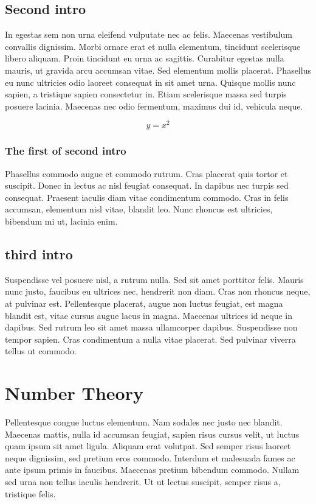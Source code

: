 \documentclass[a4paper, 12pt]{article}
\begin{document}
	
	\subsection{Second intro}
	\begin{center}
		In egestas sem non urna eleifend vulputate nec ac felis. Maecenas vestibulum convallis dignissim. Morbi ornare erat et nulla elementum, tincidunt scelerisque libero aliquam. Proin tincidunt eu urna ac sagittis. Curabitur egestas nulla mauris, ut gravida arcu accumsan vitae. Sed elementum mollis placerat. Phasellus eu nunc ultricies odio laoreet consequat in sit amet urna. Quisque mollis nunc sapien, a tristique sapien consectetur in. Etiam scelerisque massa sed turpis posuere lacinia. Maecenas nec odio fermentum, maximus dui id, vehicula neque.
	\end{center}
	
	\begin{equation}
		y = x^2
	\end{equation}
	
	\subsubsection{The first of second intro}
	\begin{flushright}
		Phasellus commodo augue et commodo rutrum. Cras placerat quis tortor et suscipit. Donec in lectus ac nisl feugiat consequat. In dapibus nec turpis sed consequat. Praesent iaculis diam vitae condimentum commodo. Cras in felis accumsan, elementum nisl vitae, blandit leo. Nunc rhoncus est ultricies, bibendum mi ut, lacinia enim.
	\end{flushright}
	
	\subsection{third intro}
	\begin{flushleft}
		Suspendisse vel posuere nisl, a rutrum nulla. Sed sit amet porttitor felis. Mauris nunc justo, faucibus eu ultrices nec, hendrerit non diam. Cras non rhoncus neque, at pulvinar est. Pellentesque placerat, augue non luctus feugiat, est magna blandit est, vitae cursus augue lacus in magna. Maecenas ultrices id neque in dapibus. Sed rutrum leo sit amet massa ullamcorper dapibus. Suspendisse non tempor sapien. Cras condimentum a nulla vitae placerat. Sed pulvinar viverra tellus ut commodo.
	\end{flushleft}
	
	\section*{Number Theory}
	{\color{magneta}
		Pellentesque congue luctus elementum. Nam sodales nec justo nec blandit. Maecenas mattis, nulla id accumsan feugiat, sapien risus cursus velit, ut luctus quam ipsum sit amet ligula. Aliquam erat volutpat. Sed semper risus laoreet neque dignissim, sed pretium eros commodo. Interdum et malesuada fames ac ante ipsum primis in faucibus. Maecenas pretium bibendum commodo. Nullam sed urna non tellus iaculis hendrerit. Ut ut lectus suscipit, semper risus a, tristique felis.}
	
\end{document}
